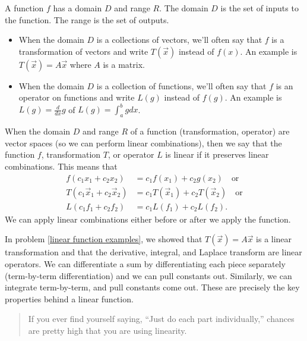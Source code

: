 \begin{definition}
 A function $f$ has a domain $D$ and range $R$. The domain $D$ is the set of inputs to the function.  The range is the set of outputs. %
\begin{itemize}
 \item When the domain $D$ is a collections of vectors, we'll often say that $f$ is a transformation of vectors and write $T(\vec x)$ instead of $f(x)$. An example is $T(\vec x)=A\vec x$ where $A$ is a matrix. 
 \item When the domain $D$ is a collection of functions, we'll often say that $f$ is an operator on functions and write $L(g)$ instead of $f(g)$. An example is $L(g)=\frac{d}{dx}g$ of $L(g) = \int_a^b gdx$.
\end{itemize}
\end{definition}
\begin{definition}
 When the domain $D$ and range $R$ of a function (transformation, operator) are vector spaces (so we can perform linear combinations), then we say that the function $f$, transformation $T$, or operator $L$ is linear if it preserves linear combinations. This means that 
\begin{align*}
f(c_1x_1+c_2x_2) &= c_1f(x_1)+c_2g(x_2) \quad \text{or}\\
T(c_1\vec x_1+c_2\vec x_2) &= c_1T(\vec x_1)+c_2T(\vec x_2) \quad \text{or}\\
L(c_1 f_1+c_2 f_2) &= c_1L( f_1)+c_2L( f_2). 
\end{align*}
We can apply linear combinations either before or after we apply the function. 
\end{definition}

In problem \ref{linear function examples}, we showed that $T(\vec x)=A\vec x$ is a linear transformation and that the derivative, integral, and Laplace transform are linear operators. 
We can differentiate a sum by differentiating each piece separately (term-by-term differentiation) and we can pull constants out.  Similarly, we can integrate term-by-term, and pull constants come out.  These are precisely the key properties behind a linear function. 
\begin{quote}
If you ever find yourself saying, ``Just do each part individually,'' chances are pretty high that you are using linearity.  
\end{quote}

